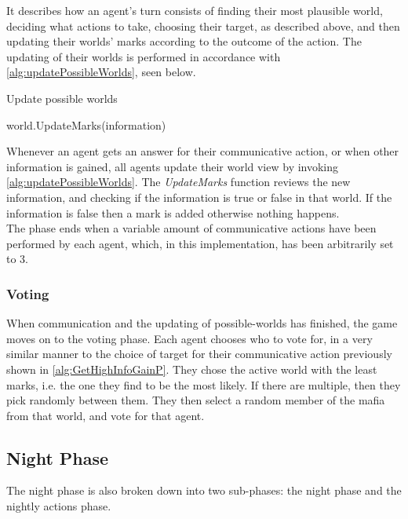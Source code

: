 \setcounter{algorithmcaption}{5}
It describes how an agent's turn consists of finding their most plausible world,
deciding what actions to take, choosing their target, as described above, and
then updating their worlds' marks according to the outcome of the action.
The updating of their worlds is performed in accordance with
\cref{alg:updatePossibleWorlds}, seen below.
\begin{algorithm}[H]
	\caption{Update possible worlds}
	\begin{algorithmic}[1]
		\State world.UpdateMarks(information)
		\EndFor
		\EndFor
		\EndFunction
	\end{algorithmic}\label{alg:updatePossibleWorlds}
\end{algorithm}
\setcounter{algorithmcaption}{6}
Whenever an agent gets an answer for their communicative action, or when other information is gained, all agents update their
world view by invoking \cref{alg:updatePossibleWorlds}. The \textit{UpdateMarks} function reviews the new information, and checking if the information is true or false in that world. If the information is false then a mark is added otherwise nothing happens.\\

The phase ends when a variable amount of communicative actions have been
performed by each agent, which, in this implementation, has been arbitrarily
set to 3.

\subsubsection{Voting}\label{sec:voting}
When communication and the updating of possible-worlds has finished, the game
moves on to the voting phase. Each agent chooses who to vote for, in a very
similar manner to the choice of target for their communicative action
previously shown in \cref{alg:GetHighInfoGainP}. They chose the active world
with the least marks, i.e. the one they find to be the most likely. If there
are multiple, then they pick randomly between them. They then select a random
member of the mafia from that world, and vote for that agent.

\subsection{Night Phase}\label{sec:nightPhase}
The night phase is also broken down into two sub-phases: the night phase and
the nightly actions phase.

